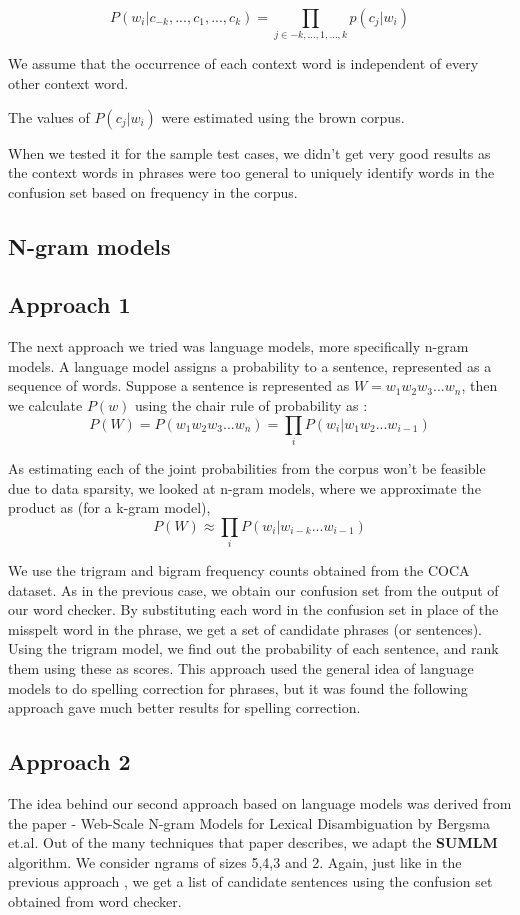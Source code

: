 \[P(w_i|c_{-k},...,c_{1},...,c_{k}) = \prod_{j \in -k,...,1,...,k} p(c_j|w_i) \]

We assume that the occurrence of each context word is independent of every other context word.

The values of $P(c_j|w_i)$ were estimated using the brown corpus.

When we tested it for the sample test cases, we didn't get very good results as the context words in phrases were too general to uniquely identify words in the confusion set based on frequency in the corpus.

\subsection{N-gram models}
\subsection*{Approach 1}
The next approach we tried was language models, more specifically n-gram models. A language model assigns a probability to a sentence, represented as a sequence of words. Suppose a sentence is represented as $W = w_1w_2w_3...w_n$, then we calculate $P(w)$ using the chair rule of probability as :
\[P(W) = P(w_1w_2w_3...w_n) = \prod_i P(w_i|w_1w_2...w_{i-1})\]

As estimating each of the joint probabilities from the corpus won't be feasible due to data sparsity, we looked at n-gram models, where we approximate the product as (for a k-gram model),
\[P(W) \approx \prod_i P(w_i|w_{i-k}...w_{i-1}) \]

We use the trigram and bigram frequency counts obtained from the COCA dataset.
As in the previous case, we obtain our confusion set from the output of our word checker. By substituting each word in the confusion set in place of the misspelt word in the phrase, we get a set of candidate phrases (or sentences). 
Using the trigram model, we find out the probability of each sentence, and rank them using these as scores.  This approach used the general idea of language models to do spelling correction for phrases, but it was found the following approach gave much better results for spelling correction.


\subsection*{Approach 2}
The idea behind our second approach based on language models was derived from the paper - Web-Scale N-gram Models for Lexical Disambiguation  by Bergsma et.al.
Out of the many techniques that paper describes, we adapt the \textbf{SUMLM} algorithm. 
We consider ngrams of sizes 5,4,3 and 2. Again, just like in the previous approach , we get a list of candidate sentences using the confusion set obtained from word checker.

